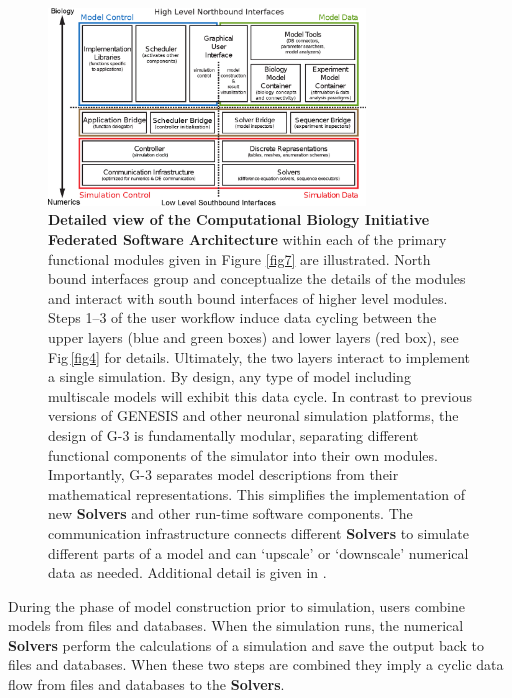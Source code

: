 \documentclass[10pt,letterpaper]{article}
\begin{document}
\begin{figure}[h!t]
  \begin{center}
    \includegraphics[width=0.75\textwidth]{figures/cbi-architecture-expanded.eps}
  \end{center}
  \caption{{\small{\bf Detailed view of the Computational Biology Initiative Federated Software Architecture} within each of the primary functional modules given in Figure \ref{fig7} are illustrated.  North bound interfaces group and conceptualize the details of the modules and interact with south bound interfaces of higher level modules.  Steps 1--3 of the user workflow induce data cycling between the upper layers (blue and green boxes) and lower layers (red box), see Fig\,\ref{fig4} for details. Ultimately, the two layers interact to implement a single simulation. By design, any type of model including multiscale models will exhibit this data cycle. In contrast to previous versions of GENESIS and other neuronal simulation platforms, the design of G-3 is fundamentally modular, separating different functional components of the simulator into their own modules. Importantly, G-3 separates model descriptions from their mathematical representations.  This simplifies the implementation of new {\bf Solvers} and other run-time software components. The communication infrastructure connects different {\bf Solvers} to simulate different parts of a model and can `upscale' or `downscale' numerical data as needed. Additional detail is given in \cite{cornelis12}.}}
  \label{fig8}
\end{figure}

During the phase of model construction prior to simulation, users combine models from files and databases.  When the simulation runs, the numerical {\bf Solvers} perform the calculations of a simulation and save the output back to files and databases.  When these two steps are combined they imply a cyclic data flow from files and databases to the {\bf Solvers}.
\end{document}
